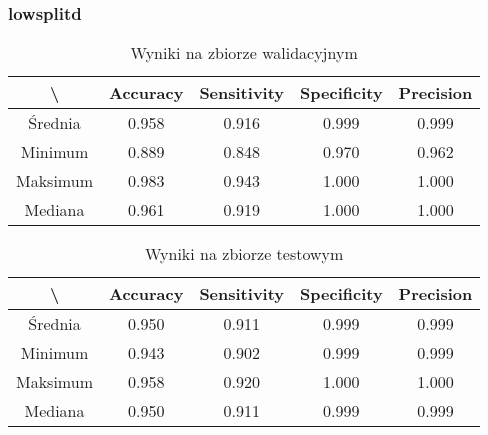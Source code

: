 \newpage
\subsubsection{lowsplitd}

\begin{table}[!h]
	\centering
	\caption{Wyniki na zbiorze walidacyjnym}
	\vspace{6pt}
	{\footnotesize
		\begin{tabular}{|c|c|c|c|c|}
      \hline \textbackslash & Accuracy & Sensitivity & Specificity & Precision \\
      \hline Średnia & 0.958 & 0.916 & 0.999 & 0.999 \\
      \hline Minimum & 0.889 & 0.848 & 0.970 & 0.962 \\
      \hline Maksimum & 0.983 & 0.943 & 1.000 & 1.000 \\
      \hline Mediana & 0.961 & 0.919 & 1.000 & 1.000 \\
      \hline
		\end{tabular}
	}
	\vspace{0pt}
\end{table}

\begin{table}[!h]
	\centering
	\caption{Wyniki na zbiorze testowym}
	\vspace{6pt}
	{\footnotesize
		\begin{tabular}{|c|c|c|c|c|}
      \hline \textbackslash & Accuracy & Sensitivity & Specificity & Precision \\
      \hline Średnia & 0.950 & 0.911 & 0.999 & 0.999 \\
      \hline Minimum & 0.943 & 0.902 & 0.999 & 0.999 \\
      \hline Maksimum & 0.958 & 0.920 & 1.000 & 1.000 \\
      \hline Mediana & 0.950 & 0.911 & 0.999 & 0.999 \\
      \hline
		\end{tabular}
	}
	\vspace{0pt}
\end{table}
